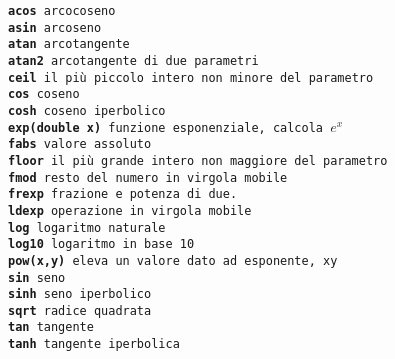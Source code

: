 \documentclass[11pt]{article}
\begin{document}
\begin{mdframed}[backgroundcolor=panna]
\texttt{{\bf acos}	arcocoseno
\\
{\bf asin}	arcoseno
\\
{\bf atan}	arcotangente
\\
{\bf atan2}	arcotangente di due parametri
\\
{\bf ceil}	il più piccolo intero non minore del parametro
\\
{\bf cos}	coseno
\\
{\bf cosh}	coseno iperbolico
\\
{\bf exp(double x)}	funzione esponenziale, calcola $e^x$
\\
{\bf fabs}	valore assoluto
\\
{\bf floor}	il più grande intero non maggiore del parametro
\\
{\bf fmod}	resto del numero in virgola mobile
\\
{\bf frexp}	frazione e potenza di due.
\\
{\bf ldexp}	operazione in virgola mobile
\\
{\bf log}	logaritmo naturale
\\
{\bf log10}	logaritmo in base 10
\\
{\bf pow(x,y)}	eleva un valore dato ad esponente, xy
\\
{\bf sin}	seno
\\
{\bf sinh}	seno iperbolico
\\
{\bf sqrt}	radice quadrata
\\
{\bf tan}       tangente
\\
{\bf tanh}	tangente iperbolica
}
\end{mdframed}
\end{document}
